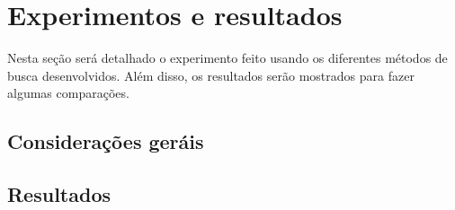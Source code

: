 \section{Experimentos e resultados}
\label{sec:experiments}

Nesta seção será detalhado o experimento feito usando os diferentes métodos de busca desenvolvidos. Além disso, os resultados serão mostrados para fazer algumas comparações.

\subsection{Considerações geráis}
\label{subsec:setup}


\subsection{Resultados}
\label{subsec:results}